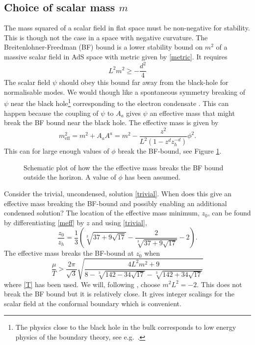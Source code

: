 \documentclass[12pt]{report}
\newcommand{\At}{\ensuremath{{\phi}}}
\begin{document}
\subsection{Choice of scalar mass $m$}
The mass squared of a scalar field in flat space must be non-negative for stability. This is though not the case in a space with negative curvature. The Breitenlohner-Freedman (BF) bound is a lower stability bound on $m^2$ of a massive scalar field in AdS space with metric given by \eqref{metric}. It requires \cite{Kleban:2004bv}
\begin{equation}
 L^2m^2\geq-\frac{d^2}{4}\label{BF}
\end{equation}
The scalar field $\psi$ should obey this bound far away from the black-hole for normalisable modes. We would though like a spontaneous symmetry breaking of $\psi$ near the black hole\footnote{The physics close to the black hole in the bulk corresponds to low energy physics of the boundary theory, see e.g.~\cite{McGreevy:2009xe}.} corresponding to the electron condensate \cite{Gubser:2008px}. This can happen because the coupling of $\psi$ to $A_a$ gives $\psi$ an effective mass that might break the BF bound near the black hole. The effective mass is given by
\begin{equation}
 m_{\mathrm{eff}}^2=m^2+A_aA^a
=m^2-\frac{z^2}{L^2(1-z^dz_h^{-d})}\At^2.
\label{meff}
\end{equation}
This can for large enough values of $\At$ break the BF-bound, see Figure \ref{BF}.
\begin{figure}
\centering

\caption{Schematic plot of how the the effective mass breaks the BF bound outside the horizon. A value of $\At$ has been assumed.\label{BF}}
\end{figure}
Consider the trivial, uncondensed, solution \eqref{trivial}. When does this give an effective mass breaking the BF-bound and possibly enabling an additional condensed solution? The location of the effective mass minimum, $z_0$, can be found by differentiating \eqref{meff} by $z$ and using \eqref{trivial},
\begin{equation}
\frac{z_0}{z_h}=\frac{1}{3} \left(\sqrt[3]{37+9 \sqrt{17}}-\frac{2}{\sqrt[3]{37+9 \sqrt{17}}}-2\right).
\end{equation}
The effective mass breaks the BF-bound at $z_0$ when
\begin{equation}
 \frac{\mu}{T}>
\frac{2\pi }{\sqrt{3}} \sqrt{\frac{4 L^2 m^2+9}{8-\sqrt[3]{142-34
   \sqrt{17}}-\sqrt[3]{142+34 \sqrt{17}}}}
\end{equation}
where \eqref{T} has been used. We will, following \cite{hartnoll8, horowitz}, choose $m^2L^2=-2$. This does not break the BF bound but it is relatively close. It gives integer scalings for the scalar field at the conformal boundary which is convenient.%
\end{document}
